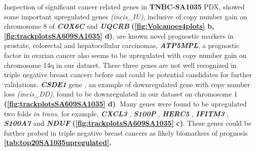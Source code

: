  Inspection of significant cancer related genes in \textbf{TNBC-SA1035} PDX, showed some important upregulated genes \textit{(incis\_IU)}, inclusive of  copy number gain on chromosome 8 of \textit{\textbf{COX6C}} \cite{yang2018overexpression,chang2017estrogen} and 
 \textit{\textbf{UQCRB}} \cite{kim2017mitochondrial,park2017mitochondrial} \textbf{(\autoref{fig:Volcanoes4plots} b, \autoref{fig:trackplotsSA609SA1035} d)}, are known novel prognostic markers in prostate, colorectal and hepatocellular carcinomas, \textit{\textbf{ATP5MPL}}, a prognostic factor in ovarian cancer also seems to be upregulated with copy number gain on chromosome 14q in our dataset. These three genes are not well recognized in triple negative breast cancers before and could be potential candidates for further validations. \textit{\textbf{CSDE1} } gene \cite{martinez2019unr}, an example of downregulated gene with copy number loss \textit{(incis\_DD)}, found to be downregulated in our dataset on chromosome 1 \textbf{(\autoref{fig:trackplotsSA609SA1035} d)}.
 Many genes were found to be upregulated two folds \textit{in trans}, for example, \textit{\textbf{CXCL3} }\cite{gui2016overexpression, karin2020cxcr3}, \textit{\textbf{S100P}} \cite{arumugam2011s100p,cong2020calcium}, 
\textit{\textbf{HERC5}} \cite{wrage2015identification}, 
\textit{\textbf{IFITM3}} \cite{liu2019ifitm3}, \textit{\textbf{S100A7}} 
\cite{zhang2019clinical, mayama2018olfm} and \textit{\textbf{NDUF}} 
\cite{li2015down} \textbf{(\autoref{fig:trackplotsSA609SA1035} c)}. These genes could be further probed in triple negative breast cancers as likely biomarkers of prognosis \textbf{\autoref{tab:top20SA1035upregulated}.}

